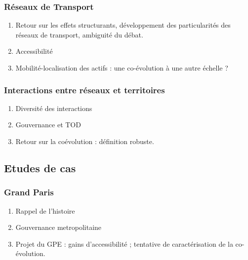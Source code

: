 \subsubsection{Réseaux de Transport}



\begin{enumerate}
	\item Retour sur les effets structurants, développement des particularités des réseaux de transport, ambiguité du débat.
	\item Accessibilité
	\item Mobilité-localisation des actifs : une co-évolution à une autre échelle ?
\end{enumerate}


\subsubsection{Interactions entre réseaux et territoires}


\begin{enumerate}
	\item Diversité des interactions
	\item Gouvernance et TOD
	\item Retour sur la coévolution : définition robuste.
\end{enumerate}



\subsection{Etudes de cas}


\subsubsection{Grand Paris}

\begin{enumerate}
	\item Rappel de l'histoire
	\item Gouvernance metropolitaine
	\item Projet du GPE : gains d'accessibilité ; tentative de caractérisation de la co-évolution.
\end{enumerate}


